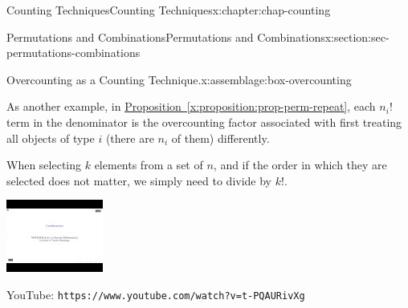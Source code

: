 \documentclass[oneside,10pt,]{book}
\newcommand{\xreffont}{\relax}
\newcommand{\mono}[1]{\texttt{#1}}
\numberwithin{equation}{section}
\newlength{\qrsize}
\newlength{\previewwidth}
\begin{document}
\begin{chapterptx}{Counting Techniques}{}{Counting Techniques}{}{}{x:chapter:chap-counting}
\begin{sectionptx}{Permutations and Combinations}{}{Permutations and Combinations}{}{}{x:section:sec-permutations-combinations}
\begin{assemblage}{Overcounting as a Counting Technique.}{x:assemblage:box-overcounting}
\par
As another example, in \hyperref[x:proposition:prop-perm-repeat]{Proposition~{\xreffont\ref{x:proposition:prop-perm-repeat}}}, each \(n_i!\) term in the denominator is the overcounting factor associated with first treating all objects of type \(i\) (there are \(n_i\) of them) differently.%
\end{assemblage}
When selecting \(k\) elements from a set of \(n\), and if the order in which they are selected does not matter, we simply need to divide by \(k!\).%
\begin{sidebyside}{1}{0}{0}{0}%
\begin{sbspanel}{1}%
\setlength{\qrsize}{9em}
\setlength{\previewwidth}{\linewidth}
\addtolength{\previewwidth}{-\qrsize}
\begin{tcbraster}[raster columns=2, raster column skip=1pt, raster halign=center, raster force size=false, raster left skip=0pt, raster right skip=0pt]%
\begin{tcolorbox}[previewstyle, width=\previewwidth]%
\includegraphics[width=0.80\linewidth,height=\qrsize,keepaspectratio]{images/video-combination.jpg}%
\end{tcolorbox}%
\begin{tcolorbox}[qrstyle]%
{\hypersetup{urlcolor=black}}%
\end{tcolorbox}%
\begin{tcolorbox}[captionstyle]%
\small YouTube: \mono{https://www.youtube.com/watch?v=t-PQAURivXg}\end{tcolorbox}%
\end{tcbraster}%
\end{sbspanel}%
\end{sidebyside}%
\par

\end{sectionptx}
\end{chapterptx}
\end{document}
